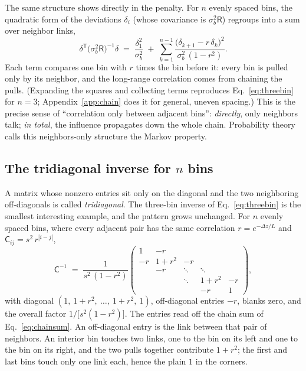 \documentclass[11pt]{article}
\newcommand{\Cov}{\mathsf{C}}
\newcommand{\T}{^{\mathsf{T}}}
\begin{document}
The same structure shows directly in the penalty.  For $n$ evenly
spaced bins, the quadratic form of the deviations $\delta_i$ (whose
covariance is $\sigma_b^2 \mathsf{R}$) regroups into a sum over
neighbor links,
\begin{equation}
  \delta\T \bigl(\sigma_b^2 \mathsf{R}\bigr)^{-1} \delta
  \;=\;
  \frac{\delta_1^2}{\sigma_b^2}
  \;+\;
  \sum_{k=1}^{n-1}
  \frac{\bigl(\delta_{k+1} - r\,\delta_k\bigr)^2}
       {\sigma_b^2\,(1 - r^2)} .
  \label{eq:chainsum}
\end{equation}
Each term compares one bin with $r$ times the bin before it: every bin
is pulled only by its neighbor, and the long-range correlation comes
from chaining the pulls.  (Expanding the squares and collecting terms
reproduces Eq.~\eqref{eq:threebin} for $n = 3$; Appendix~\ref{app:chain}
does it for general, uneven spacing.)  This is the precise sense of
``correlation only between adjacent bins'': \emph{directly}, only
neighbors talk; \emph{in total}, the influence propagates down the
whole chain.  Probability theory calls this neighbors-only structure
the Markov property.

\subsection{The tridiagonal inverse for $n$ bins}
\label{sec:tridiag}

A matrix whose nonzero entries sit only on the diagonal and the two
neighboring off-diagonals is called \emph{tridiagonal}.  The three-bin
inverse of Eq.~\eqref{eq:threebin} is the smallest interesting example,
and the pattern grows unchanged.  For $n$ evenly spaced bins, where
every adjacent pair has the same correlation $r = e^{-\Delta z / L}$
and $\Cov_{ij} = s^2\, r^{|i - j|}$,
\begin{equation}
  \Cov^{-1} \;=\;
  \frac{1}{s^2\,(1 - r^2)}
  \begin{pmatrix}
    1      & -r     &        &        &        \\
    -r     & 1+r^2  & -r     &        &        \\
           & -r     & \ddots & \ddots &        \\
           &        & \ddots & 1+r^2  & -r     \\
           &        &        & -r     & 1
  \end{pmatrix},
  \label{eq:ar1}
\end{equation}
with diagonal $(1,\ 1+r^2,\ \dots,\ 1+r^2,\ 1)$, off-diagonal entries
$-r$, blanks zero, and the overall factor $1/\bigl[s^2(1-r^2)\bigr]$.
The entries read off the chain sum of Eq.~\eqref{eq:chainsum}.  An
off-diagonal entry is the link between that pair of neighbors.  An
interior bin touches two links, one to the bin on its left and one to
the bin on its right, and the two pulls together contribute
$1 + r^2$; the first and last bins touch only one link each, hence the
plain $1$ in the corners.
\end{document}
